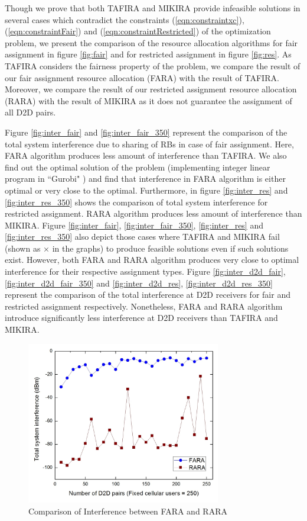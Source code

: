 \documentclass{ieeeaccess}
\begin{document}
\smallskip
 
Though we prove that both TAFIRA and MIKIRA provide infeasible solutions in several cases which contradict the constraints (\ref{eqn:constraintxc}), (\ref{eqn:constraintFair}) and (\ref{eqn:constraintRestricted})  of the optimization problem, we present the comparison of the resource allocation algorithms for fair assignment in figure \ref{fig:fair} and for restricted assignment in figure \ref{fig:res}. As TAFIRA considers the fairness property of the problem, we compare the result of our fair assignment resource allocation (FARA) with the result of TAFIRA. Moreover, we compare the result of our restricted assignment resource allocation (RARA) with the result of MIKIRA as it does not guarantee the assignment of all D2D pairs.

\smallskip
 
Figure \ref{fig:inter_fair} and \ref{fig:inter_fair_350} represent the comparison of the total system interference due to sharing of RBs in case of fair assignment. Here, FARA algorithm produces less amount of interference than TAFIRA. We also find out the optimal solution of the problem (implementing integer linear program in ``Gurobi" \cite{gurobi}) and find that interference in FARA algorithm is  either optimal or very close to the optimal. Furthermore, in figure \ref{fig:inter_res} and \ref{fig:inter_res_350} shows the comparison of total system interference for restricted assignment. RARA algorithm produces less amount of interference than MIKIRA. Figure \ref{fig:inter_fair}, \ref{fig:inter_fair_350}, \ref{fig:inter_res} and \ref{fig:inter_res_350} also depict those cases where TAFIRA and MIKIRA fail (shown as $\times$ in the graphs) to produce feasible solutions even if such solutions exist. However, both FARA and RARA algorithm produces very close to optimal interference for their respective assignment types. Figure \ref{fig:inter_d2d_fair}, \ref{fig:inter_d2d_fair_350} and \ref{fig:inter_d2d_res}, \ref{fig:inter_d2d_res_350} represent the comparison of the total interference at D2D receivers for fair and restricted assignment respectively. Nonetheless, FARA and RARA algorithm introduce significantly less interference at D2D receivers than TAFIRA and MIKIRA. 


\begin{figure}[t]
\centering
\includegraphics[width=85mm]{Graph/inter_rara_vs_fara.jpg}
\vspace{-0.3cm}
\caption{Comparison of Interference between FARA and RARA
\label{fig:fara_vs_rara)}}
\end{figure}
\end{document}
